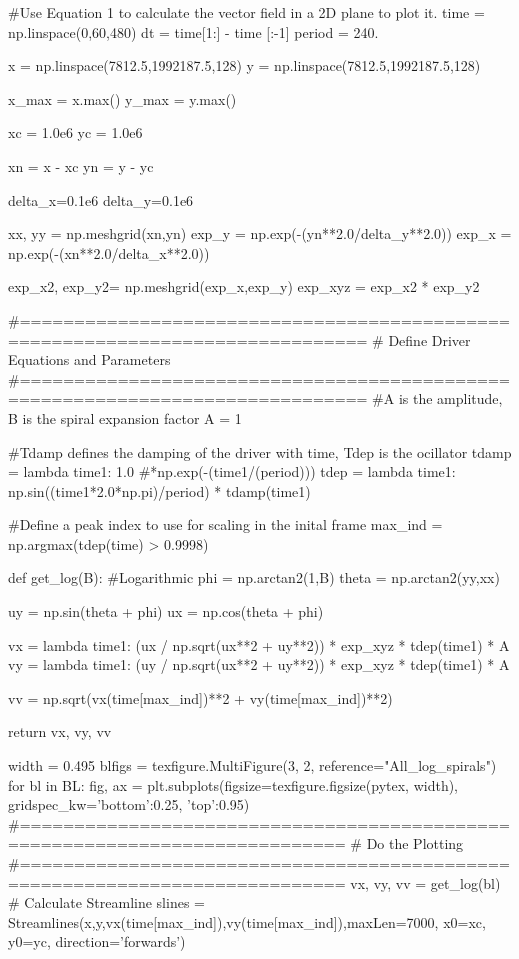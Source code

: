 \begin{pycode}[chapter5]
#Use Equation 1 to calculate the vector field in a 2D plane to plot it.
time = np.linspace(0,60,480)
dt = time[1:] - time [:-1]
period = 240.

x = np.linspace(7812.5,1992187.5,128)
y = np.linspace(7812.5,1992187.5,128)

x_max = x.max()
y_max = y.max()

xc = 1.0e6
yc = 1.0e6

xn = x - xc
yn = y - yc

delta_x=0.1e6
delta_y=0.1e6

xx, yy = np.meshgrid(xn,yn)
exp_y = np.exp(-(yn**2.0/delta_y**2.0))
exp_x = np.exp(-(xn**2.0/delta_x**2.0))

exp_x2, exp_y2= np.meshgrid(exp_x,exp_y)
exp_xyz = exp_x2 * exp_y2


#==============================================================================
# Define Driver Equations and Parameters
#==============================================================================
#A is the amplitude, B is the spiral expansion factor
A = 1

#Tdamp defines the damping of the driver with time, Tdep is the ocillator
tdamp = lambda time1: 1.0 #*np.exp(-(time1/(period)))
tdep = lambda time1: np.sin((time1*2.0*np.pi)/period) * tdamp(time1)

#Define a peak index to use for scaling in the inital frame
max_ind = np.argmax(tdep(time) > 0.9998)

def get_log(B):
    #Logarithmic
    phi = np.arctan2(1,B)
    theta = np.arctan2(yy,xx)
    
    uy = np.sin(theta + phi)
    ux =  np.cos(theta + phi)
    
    vx = lambda time1: (ux / np.sqrt(ux**2 + uy**2)) * exp_xyz * tdep(time1) * A
    vy = lambda time1: (uy / np.sqrt(ux**2 + uy**2)) * exp_xyz * tdep(time1) * A
    
    vv = np.sqrt(vx(time[max_ind])**2 + vy(time[max_ind])**2)
    
    return vx, vy, vv

width = 0.495
blfigs = texfigure.MultiFigure(3, 2, reference="All_log_spirals")
for bl in BL:
    fig, ax = plt.subplots(figsize=texfigure.figsize(pytex, width),
                           gridspec_kw={'bottom':0.25, 'top':0.95})
    #============================================================================
    # Do the Plotting
    #============================================================================
    vx, vy, vv = get_log(bl)
    # Calculate Streamline
    slines = Streamlines(x,y,vx(time[max_ind]),vy(time[max_ind]),maxLen=7000,
    x0=xc, y0=yc, direction='forwards')
    

\end{pycode}
